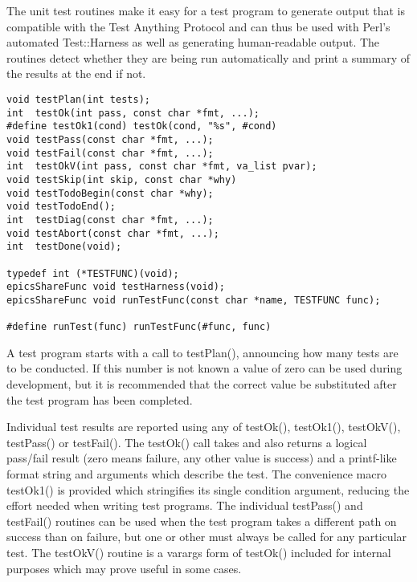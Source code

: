 The unit test routines make it easy for a test program to generate output that is compatible with the Test Anything Protocol and can thus be used with Perl's automated Test::Harness as well as generating human-readable output.
The routines detect whether they are being run automatically and print a summary of the results at the end if not.

\begin{verbatim}
void testPlan(int tests);
int  testOk(int pass, const char *fmt, ...);
#define testOk1(cond) testOk(cond, "%s", #cond)
void testPass(const char *fmt, ...);
void testFail(const char *fmt, ...);
int  testOkV(int pass, const char *fmt, va_list pvar);
void testSkip(int skip, const char *why)
void testTodoBegin(const char *why);
void testTodoEnd();
int  testDiag(const char *fmt, ...);
void testAbort(const char *fmt, ...);
int  testDone(void);

typedef int (*TESTFUNC)(void);
epicsShareFunc void testHarness(void);
epicsShareFunc void runTestFunc(const char *name, TESTFUNC func);

#define runTest(func) runTestFunc(#func, func)
\end{verbatim}

A test program starts with a call to testPlan(), announcing how many tests are to be conducted.
If this number is not known a value of zero can be used during development, but it is recommended that the correct value be substituted after the test program has been completed.

Individual test results are reported using any of testOk(), testOk1(), testOkV(), testPass() or testFail().
The testOk() call takes and also returns a logical pass/fail result (zero means failure, any other value is success) and a printf-like format string and arguments which describe the test.
The convenience macro testOk1() is provided which stringifies its single condition argument, reducing the effort needed when writing test programs.
The individual testPass() and testFail() routines can be used when the test program takes a different path on success than on failure, but one or other must always be called for any particular test.
The testOkV() routine is a varargs form of testOk() included for internal purposes which may prove useful in some cases.

